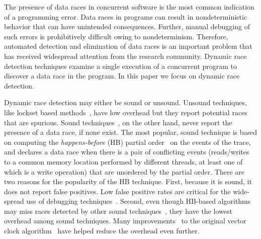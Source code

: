 
The presence of data races in concurrent software is the most common
indication of a programming error. Data races in programs can result
in nondeterministic behavior that can have unintended
consequences. Further, manual debugging of such errors 
is prohibitively difficult owing to nondeterminism.
Therefore, automated detection and elimination of data races is an
important problem that has received widespread attention from the
research community. 
Dynamic race detection techniques examine a single execution of a
concurrent program to discover a data race in the program.
In this paper we focus on dynamic race detection.

Dynamic race detection may either be sound or unsound. Unsound
techniques, like lockset based methods~\cite{savage1997eraser}, have
low overhead but they report potential races that are spurious. Sound
techniques~\cite{lamport1978time,Mattern1988,Said2011,rv2014,cp2012,wcp2017},
on the other hand, never report the presence of a data race, if none
exist. The most popular, sound technique is based on computing the
\emph{happens-before} (HB) partial order~\cite{lamport1978time} on the
events of the trace, and declares a data race when there is a pair of
conflicting events (reads/writes to a common memory location performed
by different threads, at least one of which is a write operation) that
are unordered by the partial order. There are two reasons for the
popularity of the HB technique. First, because it is sound, it does
not report false positives. Low false positive rates are critical for
the wide-spread use of debugging techniques~\cite{threadsanitizer,developersRace14}. Second, even
though HB-based algorithms may miss races detected by other sound
techniques~\cite{Said2011,rv2014,cp2012,wcp2017}, they have the lowest
overhead among sound techniques. Many
improvements~\cite{Pozniansky:2003:EOD:966049.781529,fasttrack,elmas2007goldilocks}
to the original vector clock algorithm~\cite{Mattern1988} have helped
reduce the overhead even further.

